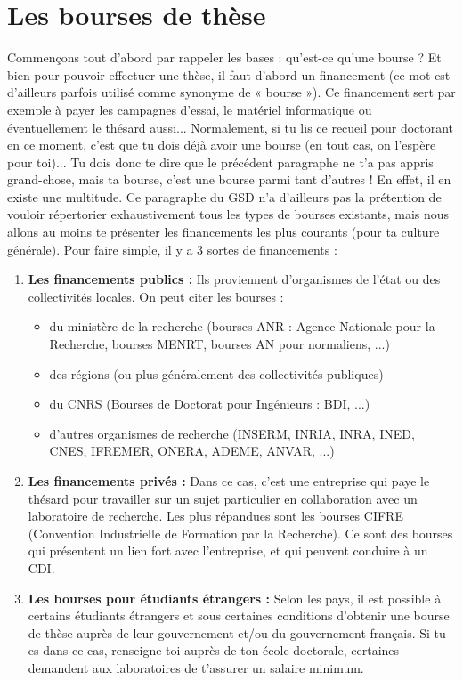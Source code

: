 \section{Les bourses de thèse}\trad
Commençons tout d'abord par rappeler les bases : qu'est-ce qu'une bourse ?
Et bien pour pouvoir effectuer une thèse, il faut d'abord un financement (ce mot est d'ailleurs parfois utilisé comme synonyme de « bourse »).
Ce financement sert par exemple à payer les campagnes d'essai, le matériel informatique ou éventuellement le thésard aussi...
Normalement, si tu lis ce recueil pour doctorant en ce moment, c'est que tu dois déjà avoir une bourse (en tout cas, on l'espère pour toi)...
Tu dois donc te dire que le précédent paragraphe ne t'a pas appris grand-chose, mais ta bourse, c'est une bourse parmi tant d'autres !
En effet, il en existe une multitude.
Ce paragraphe du GSD n'a d'ailleurs pas la prétention de vouloir répertorier exhaustivement tous les types de bourses existants, mais nous allons au moins te présenter les financements les plus courants (pour ta culture générale).
Pour faire simple, il y a 3 sortes de financements :
\begin{enumerate}
  \item \textbf{Les financements publics :} Ils proviennent d'organismes de l'état ou des collectivités locales. On peut citer les bourses :
  \begin{itemize}
    \item du ministère de la recherche (bourses ANR : Agence Nationale pour la Recherche, bourses MENRT, bourses AN pour normaliens, ...)
    \item des régions (ou plus généralement des collectivités publiques)
    \item du CNRS (Bourses de Doctorat pour Ingénieurs : BDI, ...)
    \item d'autres organismes de recherche (INSERM, INRIA, INRA, INED, CNES, IFREMER, ONERA, ADEME, ANVAR, ...)
  \end{itemize}
  \item \textbf{Les financements privés :} Dans ce cas, c'est une entreprise qui paye le thésard pour travailler sur un sujet particulier en collaboration avec un laboratoire de recherche. Les plus répandues sont les bourses CIFRE (Convention Industrielle de Formation par la Recherche). Ce sont des bourses qui présentent un lien fort avec l'entreprise, et qui peuvent conduire à un CDI.
  \item \textbf{Les bourses pour étudiants étrangers :} Selon les pays, il est possible à certains étudiants étrangers et sous certaines conditions d'obtenir une bourse de thèse auprès de leur gouvernement et/ou du gouvernement français. Si tu es dans ce cas, renseigne-toi auprès de ton école doctorale, certaines demandent aux laboratoires de t'assurer un salaire minimum.
\end{enumerate}

